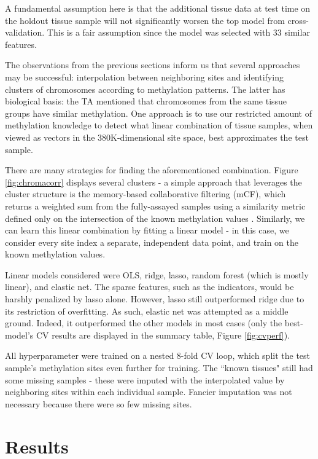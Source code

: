\documentclass{article} %
\begin{document}
A fundamental assumption here is that the additional tissue data at test time on the holdout tissue sample will not significantly worsen the top model from cross-validation. This is a fair assumption since the model was selected with 33 similar features.

The observations from the previous sections inform us that several approaches may be successful: interpolation between neighboring sites and identifying clusters of chromosomes according to methylation patterns. The latter has biological basis: the TA mentioned that chromosomes from the same tissue groups have similar methylation. One approach is to use our restricted amount of methylation knowledge to detect what linear combination of tissue samples, when viewed as vectors in the 380K-dimensional site space, best approximates the test sample.

There are many strategies for finding the aforementioned combination. Figure \ref{fig:chromacorr} displays several clusters - a simple approach that leverages the cluster structure is the memory-based collaborative filtering (mCF), which returns a weighted sum from the fully-assayed samples using a similarity metric defined only on the intersection of the known methylation values \cite{wiki:cf}. Similarly, we can learn this linear combination by fitting a linear model - in this case, we consider every site index a separate, independent data point, and train on the known methylation values.

Linear models considered were OLS, ridge, lasso, random forest (which is mostly linear), and elastic net. The sparse features, such as the indicators, would be harshly penalized by lasso alone. However, lasso still outperformed ridge due to its restriction of overfitting. As such, elastic net was attempted as a middle ground. Indeed, it outperformed the other models in most cases (only the best-model's CV results are displayed in the summary table, Figure \ref{fig:cvperf}).

All hyperparameter were trained on a nested 8-fold CV loop, which split the test sample's methylation sites even further for training. The ``known tissues" still had some missing samples - these were imputed with the interpolated value by neighboring sites within each individual sample. Fancier imputation was not necessary because there were so few missing sites.

\section{Results}
\end{document}
